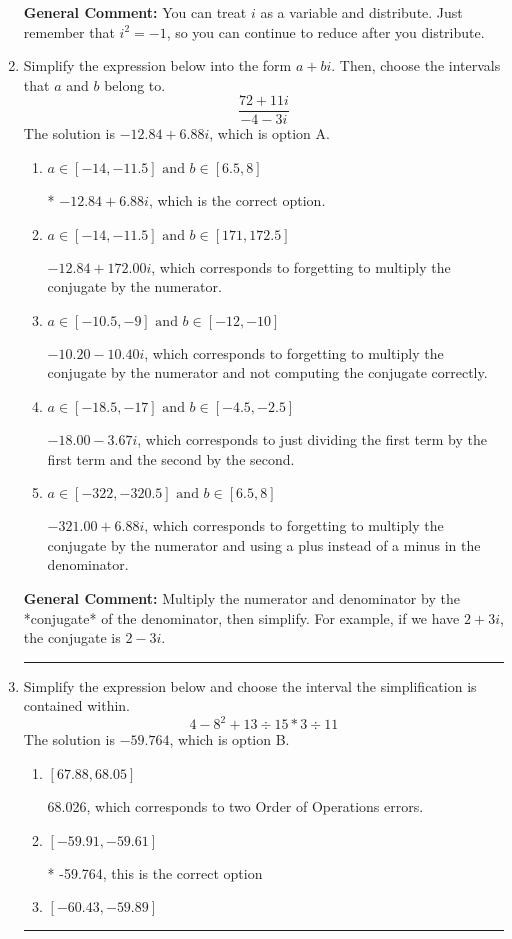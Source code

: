\documentclass{extbook}[14pt]
\newcommand{\litem}[1]{\item #1

\rule{\textwidth}{0.4pt}}
\begin{document}
\begin{enumerate}
{\textbf{General Comment:} You can treat $i$ as a variable and distribute. Just remember that $i^2=-1$, so you can continue to reduce after you distribute.
}
\litem{
Simplify the expression below into the form $a+bi$. Then, choose the intervals that $a$ and $b$ belong to.
\[ \frac{72 + 11 i}{-4 - 3 i} \]
The solution is \( -12.84  + 6.88 i \), which is option A.\begin{enumerate}[label=\Alph*.]
\item \( a \in [-14, -11.5] \text{ and } b \in [6.5, 8] \)

* $-12.84  + 6.88 i$, which is the correct option.
\item \( a \in [-14, -11.5] \text{ and } b \in [171, 172.5] \)

 $-12.84  + 172.00 i$, which corresponds to forgetting to multiply the conjugate by the numerator.
\item \( a \in [-10.5, -9] \text{ and } b \in [-12, -10] \)

 $-10.20  - 10.40 i$, which corresponds to forgetting to multiply the conjugate by the numerator and not computing the conjugate correctly.
\item \( a \in [-18.5, -17] \text{ and } b \in [-4.5, -2.5] \)

 $-18.00  - 3.67 i$, which corresponds to just dividing the first term by the first term and the second by the second.
\item \( a \in [-322, -320.5] \text{ and } b \in [6.5, 8] \)

 $-321.00  + 6.88 i$, which corresponds to forgetting to multiply the conjugate by the numerator and using a plus instead of a minus in the denominator.
\end{enumerate}

\textbf{General Comment:} Multiply the numerator and denominator by the *conjugate* of the denominator, then simplify. For example, if we have $2+3i$, the conjugate is $2-3i$.
}
\litem{
Simplify the expression below and choose the interval the simplification is contained within.
\[ 4 - 8^2 + 13 \div 15 * 3 \div 11 \]
The solution is \( -59.764 \), which is option B.\begin{enumerate}[label=\Alph*.]
\item \( [67.88, 68.05] \)

 68.026, which corresponds to two Order of Operations errors.
\item \( [-59.91, -59.61] \)

* -59.764, this is the correct option
\item \( [-60.43, -59.89] \)


\end{enumerate}}
\end{enumerate}
\end{document}
